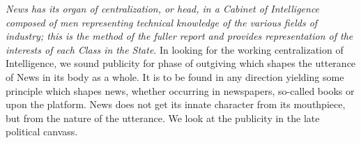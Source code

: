 \documentclass[twoside,symmetric,nobib,justified]{tufte-book}
\begin{document}
\vspace{0.05in}

\emph{News has its organ of centralization, or head, in a Cabinet of
Intelligence composed of men representing technical knowledge of the
various fields of industry; this is the method of the fuller report and
provides representation of the interests of each Class in the State}. In
looking for the working centralization of Intelligence, we sound
publicity for phase of outgiving which shapes the utterance of News in
its body as a whole. It is to be found in any direction yielding some
principle which shapes news, whether occurring in newspapers, so-called
books or upon the platform. News does not get its innate character from
its mouthpiece, but from the nature of the utterance. We look at the
publicity in the late political canvass.~
\end{document}
